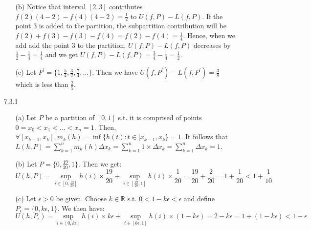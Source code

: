 \documentclass[11pt]{article}
\newcommand{\reals}{\mathbb{R}}
\begin{document}
\begin{itemize}
\begin{itemize}
            \item[(b)]
                Notice that interval $[2, 3]$ contributes $f(2)(4 - 2) - f(4)(4
                - 2) = \frac{1}{2}$ to $U(f, P) - L(f, P)$. If the point $3$ is
                added to the partition, the subpartition contribution will be
                $f(2) + f(3) - f(3) - f(4) = f(2) - f(4) = \frac{1}{4}$. Hence,
                when we add add the point $3$ to the partition, $U(f, P) - L(f,
                P)$ decreases by $\frac{1}{2} - \frac{1}{4} = \frac{1}{4}$ and
                we get $U(f, P) - L(f, P) = \frac{3}{4} - \frac{1}{4} =
                \frac{1}{2}$.
                
            \item[(c)]
                Let $P^\prime = \Big\{1, \frac{5}{4}, \frac{3}{2}, \frac{7}{4},
                \dots\Big\}$. Then we have $U(f, P^\prime) - L(f, P^\prime) =
                \frac{3}{8}$ which is less than $\frac{2}{5}$.
        \end{itemize}

    \item[7.3.1]
        \begin{itemize}
            \item[(a)]
                Let $P$ be a partition of $[0, 1]$ s.t. it is comprised of
                points $0 = x_0 < x_1 < \dots < x_n = 1$. Then, $\forall [x_{k
                - 1}, x_{k}], m_k(h) = \inf \{h(t) : t \in [x_{k - 1}, x_k\} =
                1$. It follows that $L(h, P) = \sum_{k = 1}^n m_k(h)\Delta x_k
                = \sum_{k = 1}^n 1 \times \Delta x_k = \sum_{k = 1}^n \Delta
                x_k = 1$.

            \item[(b)]
                Let $P = \{0, \frac{19}{20}, 1\}$. Then we get:
                \begin{equation*}
                    U(h, P) = \sup_{i \in [0, \frac{19}{20}]} h(i) \times
                    \frac{19}{20} + \sup_{i \in [\frac{19}{20}, 1]} h(i) \times
                    \frac{1}{20} = \frac{19}{20} + \frac{2}{20} = 1 +
                    \frac{1}{20} < 1 + \frac{1}{10}
                \end{equation*}

            \item[(c)]
                Let $\epsilon > 0$ be given. Choose $k \in \reals$ s.t. $0 < 1
                - k\epsilon < \epsilon$ and define $P_{\epsilon} = \{0,
                k\epsilon, 1\}$. We then have:
                \begin{equation*}
                    U(h, P_{\epsilon}) = \sup_{i \in [0, k\epsilon]} h(i)
                    \times k\epsilon + \sup_{i \in [k\epsilon, 1]} h(i) \times
                    (1 - k\epsilon) = 2 - k\epsilon = 1 + (1 - k\epsilon) < 1 +
                    \epsilon
                \end{equation*}
        \end{itemize}


\end{itemize}
\end{document}
